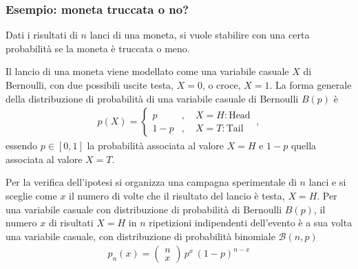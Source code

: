 \documentclass[letterpaper,10pt,italian]{jupyterBook}
\begin{document}
\subsubsection{Esempio: moneta truccata o no?}
\label{\detokenize{ch/statistics/test-fisher-coin-1:esempio-moneta-truccata-o-no}}
\sphinxAtStartPar
Dati i risultati di \(n\) lanci di una moneta, si vuole stabilire con una certa probabilità se la moneta è truccata o meno.

\sphinxAtStartPar
Il lancio di una moneta viene modellato come una variabile casuale \(X\) di Bernoulli, con due possibili uscite testa, \(X=0\), o croce, \(X=1\). La forma generale della distribuzione di probabilità di una variabile casuale di Bernoulli \(B(p)\) è
\begin{equation*}
\begin{split}p(X) = \begin{cases} p & , \quad X = H:\text{Head} \\ 1-p & , \quad X = T:\text{Tail} \end{cases} \ ,\end{split}
\end{equation*}
\sphinxAtStartPar
essendo \(p \in [0,1]\) la probabilità associata al valore \(X=H\) e \(1-p\) quella associata al valore \(X=T\).

\sphinxAtStartPar
Per la verifica dell’ipotesi si organizza una campagna sperimentale di \(n\) lanci e si sceglie come  \(x\) il numero di volte che il risultato del lancio è testa, \(X=H\).
Per una variabile casuale con distribuzione di probabilità di Bernoulli \(B(p)\), il numero \(x\) di risultati \(X=H\) in \(n\) ripetizioni indipendenti dell’evento è a sua volta una variabile casuale, con distribuzione di probabilità binomiale \(\mathscr{B}(n,p)\)
\begin{equation*}
\begin{split}p_n(x) = \left( \begin{matrix} n \\ x \end{matrix}  \right) \, p^x \, (1-p)^{n-x}\end{split}
\end{equation*}
\end{document}
